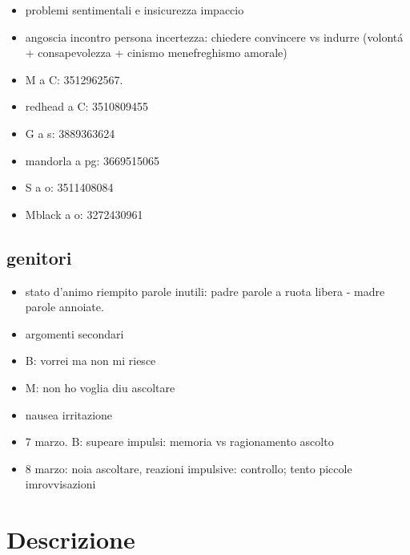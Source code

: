 \begin{itemize}

\item problemi sentimentali e insicurezza impaccio

\item angoscia incontro persona incertezza: chiedere convincere vs indurre (volont\'a + consapevolezza + cinismo menefreghismo amorale)

\item M a C: 3512962567.

\item redhead a C: 3510809455

\item G a s: 3889363624

\item mandorla a pg: 3669515065

\item S a o: 3511408084

\item Mblack a o: 3272430961

\end{itemize}

\subsection{genitori}

\begin{itemize}

\item stato d'animo riempito parole inutili: padre parole a ruota libera - madre parole annoiate.

\item argomenti secondari

\item B: vorrei ma non mi riesce

\item M: non ho voglia diu ascoltare

\item nausea irritazione

\item 7 marzo. B: supeare impulsi: memoria vs ragionamento ascolto

\item 8 marzo: noia ascoltare, reazioni impulsive: controllo; tento piccole imrovvisazioni

\end{itemize}


\section{Descrizione}

